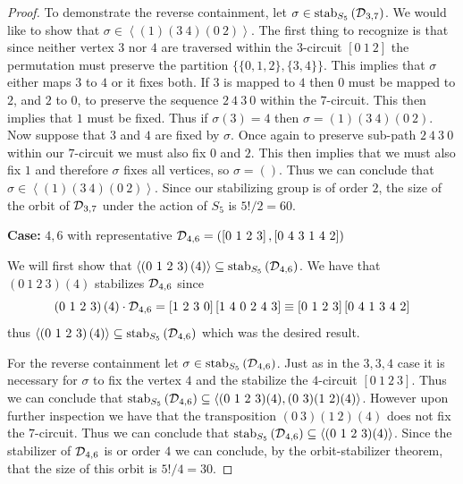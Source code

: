 \begin{proof}
To demonstrate the reverse containment, let $\sigma \in \operatorname{\mathrm{stab}}_{S_5}\left(\operatorname{\mathcal{D}}_{3,7} \right)$.  We would like to show that $\sigma \in \left<\left(1\right)\left(3\ 4\right)\left(0\ 2\right)\right>$. The first thing to recognize is that since neither vertex $3$ nor $4$ are traversed within the $3$-circuit $[0\ 1\ 2]$ the permutation must preserve the partition $\{\{0,1,2\},\{3,4\}\}$. This implies that $\sigma$ either maps $3$ to $4$ or it fixes both. If $3$ is mapped to $4$ then $0$ must be mapped to $2$, and $2$ to $0$,  to preserve the sequence $2 \ 4 \ 3\ 0$ within the $7$-circuit. This then implies that $1$ must be fixed. Thus if $\sigma(3)=4$ then $\sigma = (1)(3\ 4)(0\ 2)$. Now suppose that $3$ and $4$ are fixed by $\sigma$. Once again to preserve sub-path $2\ 4\ 3\ 0$ within our $7$-circuit we must also fix $0$ and $2$. This then implies that we must also fix $1$ and therefore $\sigma$ fixes all vertices, so $\sigma = ()$. Thus we can conclude that $\sigma \in \left<(1)(3\ 4)(0\ 2) \right>$. Since our stabilizing group is of order $2$, the size of the orbit of $\operatorname{\mathcal{D}}_{3,7}$ under the action of $S_5$ is $5!/2 = 60$.

\vspace{2ex}
\noindent
{\bf Case:} $4,6$ with representative $\pcd_{4,6} = \left(\left[0\ 1\ 2\ 3  \right],\left[0\ 4\ 3\ 1\ 4\ 2\right]\right)$
\vspace{2ex}

\noindent
We will first show that $\left< \left(0\ 1\ 2\ 3\right)\left(4\right)\right> \subseteq \stab{S_5}{\pcd_{4,6}}$. We have that $\left(0\ 1\ 2\ 3\right)\left(4\right)$ stabilizes $\operatorname{\mathcal{D}}_{4,6}$ since
\[
\acts{\left(0\ 1\ 2\ 3\right)\left(4\right)}{\pcd_{4,6}} = \left[1\ 2\ 3\ 0\right]\left[1\ 4\ 0\ 2\ 4\ 3\right] \equiv \left[0\ 1\ 2\ 3\right]\left[0\ 4\ 1\ 3\ 4\ 2\right] 
\] thus $\left<\left(0\ 1\ 2\ 3\right)\left(4\right)\right> \subseteq \stab{S_5}{\pcd_{4,6}}$ which was the desired result.  

For the reverse containment let $\sigma \in \operatorname{\mathrm{stab}}_{S_5}\left(\operatorname{\mathcal{D}}_{4,6} \right)$. Just as in the $3,3,4$ case it is necessary for $\sigma$ to fix the vertex $4$ and the stabilize the $4$-circuit $[0\ 1\ 2\ 3]$. Thus we can conclude that $\stab{S_5}{\pcd_{4,6}} \subseteq \left< (0\ 1\ 2\ 3)(4), (0\ 3)(1\ 2)(4) \right>$. However upon further inspection we have that the transposition $(0\ 3)(1\ 2)(4)$ does not fix the $7$-circuit. Thus we can conclude that $\stab{S_5}{\pcd_{4,6}} \subseteq \left< (0\ 1\ 2\ 3)(4) \right>$. Since the stabilizer of $\operatorname{\mathcal{D}}_{4,6}$ is or order $4$ we can conclude, by the orbit-stabilizer theorem, that the size of this orbit is $5!/4 = 30$.


\end{proof}
